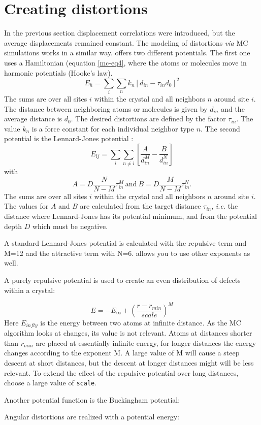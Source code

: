 \section{Creating distortions \label{mc-disp}}

In the previous section displacement correlations were introduced,
but the average displacements remained constant.  The modeling of
distortions {\it via} MC simulations works in a similar way. 
\Discus offers two different potentials. The first one uses a
Hamiltonian (equation \ref{mc-eq4}, where the atoms or molecules
move in harmonic potentials (Hooke's law).
%
\begin{equation}
    E_{h} = \sum_{i} \sum_{n} k_{n} [ d_{in} - \tau_{in} d_{0} ] ^{2}
    \label{mc-eq4}
\end{equation}
%
The sums are over all sites $i$ within the crystal and all neighbors
$n$ around site $i$.  The distance between neighboring atoms or
molecules is given by $d_{in}$ and the average distance is $d_{0}$.
The desired distortions are defined by the factor $\tau_{in}$. The
value $k_{n}$ is a force constant for each individual neighbor type
$n$. The second potential is the Lennard-Jones potential :
%
\begin{equation}
   E_{lj} = \sum_{i} \sum_{n \ne i}
            \left [ \frac{A}{d_{in}^M} - \frac{B}{d_{in}^N} \right ]
   \label{sro-eq-lennard}
\end{equation}
%
with
%
\begin{equation}
  A = D \frac{N}{N-M} \tau_{in}^M ~ \mbox{and} ~
  B = D \frac{M}{N-M} \tau_{in}^N.
  \label{sro-eq-lennard2}
\end{equation}
%
The sums are over all sites $i$ within the crystal and all
neighbors $n$ around site $i$.  The values for $A$ and $B$ are
calculated from the target distance $\tau_{in}$, {\it i.e.} the
distance where Lennard-Jones has its potential minimum, and from the
potential depth $D$ which must be negative.
\par
A standard Lennard-Jones potential is calculated with the repulsive
term and M=12 and the attractive term with N=6. \Discus allows
you to use other exponents as well.

A purely repulsive potential is used to create an even distribution
of defects within a crystal:

\begin{equation}
  E = -E_{\infty} + \left ( \frac{r-r_{min}}{scale} \right )^M
\end{equation}
Here $E_{infty}$ is the energy between two atoms at infinite 
distance. As the MC algorithm looks at changes, its value is not
relevant. Atoms at distances shorter than $r_{min}$ are placed
at essentially infinite energy, for longer distances the energy
changes according to the exponent M. A large value of M will
cause a steep descent at short distances, but the descent at longer 
distances might will be less relevant. To extend the effect of
the repulsive potential over long distances, choose a large 
value of {\tt scale}.
\par
Another potential function is the Buckingham potential:
\par
Angular distortions are realized with a potential energy:

